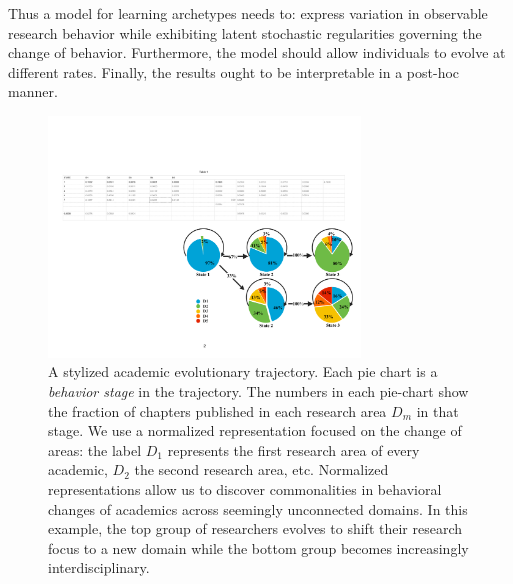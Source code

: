 Thus a model for learning archetypes needs to: express variation in observable research behavior while exhibiting latent stochastic regularities governing the change of behavior. Furthermore, the model should allow individuals to evolve at different rates. Finally, the results ought to be interpretable in a post-hoc manner.

\begin{figure}
 \centering
  \includegraphics[width=0.7\linewidth,height=6.4cm]{figures/Example_figures_Self.pdf}
 \caption{\label{fig:example} A stylized academic evolutionary trajectory. Each pie chart is a \emph{behavior stage} in the trajectory. The numbers in each pie-chart show the fraction of chapters published in each research area \textit{$D_m$} in that stage. We use a normalized representation focused on the change of areas: the label $D_1$ represents the first research area of every academic, $D_2$ the second research area, etc. Normalized representations allow us to discover commonalities in behavioral changes of academics across seemingly unconnected domains. In this example, the top group of researchers evolves to shift their research focus to a new domain while the bottom group becomes increasingly interdisciplinary.
 }
\end{figure}

